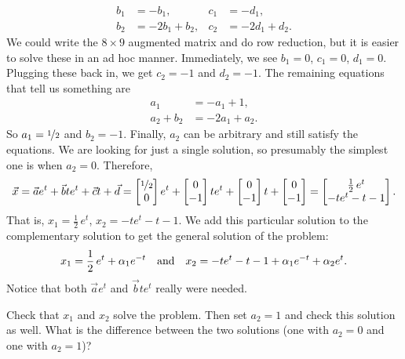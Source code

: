 \begin{example}
\begin{align*}
b_1 & = -b_1 , &
c_1 & = -d_1 , \\
b_2 & = -2b_1+b_2 , &
c_2 & = -2d_1+d_2 .
\end{align*}
We could write the $8 \times 9$ augmented matrix and do row
reduction, but it is easier to solve these in an ad hoc
manner. Immediately, we see $b_1 = 0$, $c_1 = 0$, $d_1 = 0$.  Plugging
these
back in, we get $c_2 = -1$ and $d_2 = -1$.  The remaining equations
that tell us something are
\begin{align*}
a_1 & = -a_1+1 , \\
a_2+b_2 & = -2a_1+a_2 .
\end{align*}
So $a_1 = \nicefrac{1}{2}$ and $b_2 = -1$.  Finally, $a_2$ can be arbitrary and still satisfy the
equations.  We are looking for just a single solution, so presumably the
simplest
one is when $a_2 = 0$.
Therefore,
\begin{equation*}
\vec{x} = 
\vec{a}
e^{t}
+
\vec{b}
t
e^{t}
+
\vec{c}
t +
\vec{d}
=
\begin{bmatrix}
\nicefrac{1}{2} \\ 0
\end{bmatrix}
e^t
+
\begin{bmatrix}
0 \\ -1
\end{bmatrix}
te^t
+
\begin{bmatrix}
0 \\ -1
\end{bmatrix}
t
+
\begin{bmatrix}
0 \\ -1
\end{bmatrix}
=
\begin{bmatrix}
\frac{1}{2}\,e^t \\
-te^t - t - 1
\end{bmatrix} .
\end{equation*}
That is, $x_1 = \frac{1}{2}\,e^t$,
$x_2 = -te^t - t - 1$.
We add this particular solution to the complementary solution to get the
general solution of the problem:
\begin{equation*}
x_1 = \frac{1}{2}\,e^t + 
\alpha_1 e^{-t} \quad \text{and} \quad
x_2 = -te^t - t - 1 + \alpha_1 e^{-t} + \alpha_2 e^{t}.
\avoidbreak
\end{equation*}
Notice that both $\vec{a} e^t$
and $\vec{b} te^t$ really were needed.
\end{example}

\begin{exercise}
Check that $x_1$ and $x_2$ solve the problem.  Then set $a_2 = 1$
and check this solution as well.  What is the difference between the two
solutions (one with $a_2=0$ and one with $a_2=1$)?
\end{exercise}


